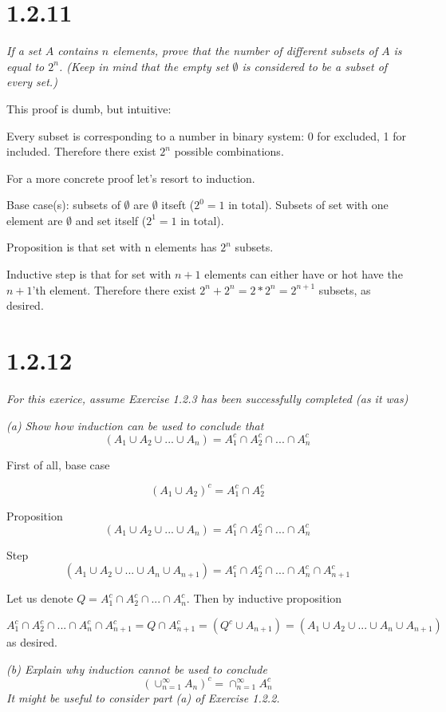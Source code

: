\documentclass[11pt,oneside,titlepage]{article}
\begin{document}
\section*{1.2.11}
\textit{If a set $A$ contains $n$ elements, prove that the number of
  different subsets of $A$ is equal to $2^n$. (Keep in mind that the empty set
  $\emptyset$ is considered to be a subset of every set.)}

This proof is dumb, but intuitive:

Every subset is corresponding to a number in binary system: 0 for excluded,
1 for included. Therefore there exist $2^n$ possible combinations.

For a more concrete proof let's resort to induction.

Base case(s): subsets of $\emptyset$ are $\emptyset$ itseft ($2^0 = 1$ in total). Subsets of
set with one element are $\emptyset$ and set itself ($2^1 = 1$ in total).

Proposition is that set with n elements has $2^n$ subsets.

Inductive step is that for set with $n + 1$ elements can either have or hot
have the $n + 1$'th element. Therefore there exist $2^n + 2^n = 2 * 2^n =
2^{n + 1}$ subsets, as desired.

\section*{1.2.12}
\textit{For this exerice, assume Exercise 1.2.3 has been successfully completed
  (as it was)}

\textit{(a) Show how induction can be used to conclude that }
$$ (A_1 \cup A_2 \cup ... \cup A_n) = A^c_1 \cap A^c_2 \cap ... \cap A^c_n$$

First of all, base case

$$ (A_1 \cup A_2)^c = A^c_1 \cap A^c_2 $$

Proposition
$$ (A_1 \cup A_2 \cup ... \cup A_n) = A^c_1 \cap A^c_2 \cap ... \cap A^c_n$$

Step
$$ (A_1 \cup A_2 \cup ... \cup A_n \cup A_{n + 1}) = A^c_1 \cap A^c_2 \cap ... \cap A^c_n \cap A^c_{n + 1}$$

Let us denote $Q = A^c_1 \cap A^c_2 \cap ... \cap A^c_n$. Then by inductive
proposition

$$  A^c_1 \cap A^c_2 \cap ... \cap A^c_n \cap A^c_{n + 1} = Q \cap A^c_{n + 1}
= (Q^c \cup A_{n + 1}) = (A_1 \cup A_2 \cup ... \cup A_n \cup A_{n + 1})
$$
as desired.

\textit{(b) Explain why induction cannot be used to conclude }
$$(\cup^{\infty}_{n = 1}A_n)^c = \cap^{\infty}_{n = 1}A^c_n$$
\textit{It might be useful to consider part (a) of Exercise 1.2.2.}
\end{document}

